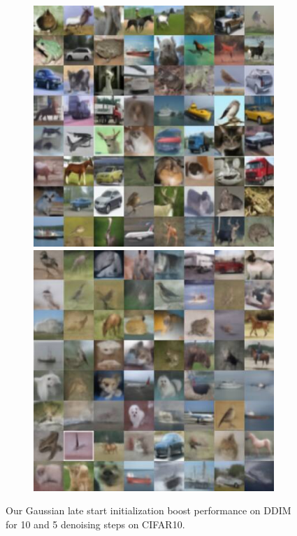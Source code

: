 \begin{figure}
\begin{subfigure}{0.495\textwidth}
  \end{subfigure}
  \begin{subfigure}{0.495\textwidth}
    \includegraphics[width=\linewidth]{figs/imgs/ddpm_ddim_cifar10_data_samples_T_900.jpg}
    \includegraphics[width=\linewidth]{figs/imgs/ddpm_ddim_cifar10_data_samples_T_800_5_steps.jpg}
  \end{subfigure}
  \caption{Our Gaussian late start initialization boost performance on DDIM for 10 and 5 denoising steps on CIFAR10.}
  \label{fig:glsddim_cifar10}
\end{figure}


